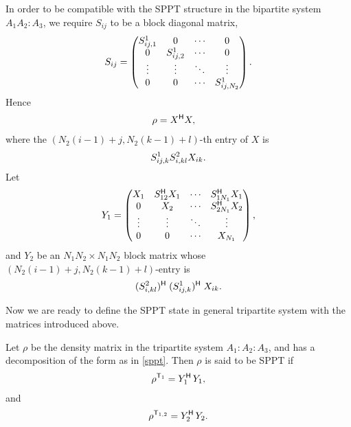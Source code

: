 In order to be compatible with the SPPT structure in the bipartite system $A_1A_2:A_3$, we require  $S_{ij}$ to be a block
diagonal matrix,
\begin{equation}
  \label{eq:7}
    S_{ij}  =
    \begin{pmatrix}
      S^1_{ij,1}& 0 & \cdots &0\\
      0 & S^1_{ij,2}&\cdots & 0\\
      \vdots & \vdots & \ddots & \vdots \\
      0& 0& \cdots & S^1_{ij,N_2}\\
          \end{pmatrix}.
        \end{equation}
 Hence
 \begin{equation}
   \begin{split}
     \rho &= X^{\mathsf{H}} X,
    \end{split}
   \label{sppt}
 \end{equation}
 where the $(N_2(i-1)+j,N_2(k-1)+l)$-th entry of $X$ is $$S^1_{ij,k} S^2_{i,kl} X_{ik}.$$
 Let \begin{align}
 	Y_1	=  \begin{pmatrix}
 	X_1 & S^{\mathsf{H}}_{12}X_1&\cdots &S^{\mathsf{H}}_{1N_1}X_1\\
 	0 & X_2&\cdots  & S^{\mathsf{H}}_{2N_1}X_2\\
 	\vdots &\vdots &\ddots &\vdots\\
 	0 & 0  &\cdots& X_{N_1}\\
 	\end{pmatrix},
 \end{align}
 and $Y_2$ be an $N_1N_2\times N_1N_2$ block matrix whose $(N_2(i-1)+j,N_2(k-1)+l)$-entry is
 \begin{align}
 (S^2_{i,kl})^{\mathsf{H}} \;(S^1_{ij,k} ) ^{\mathsf{H}} \;X_{ik}.
 \end{align}
 
Now we are ready to define the SPPT state in general tripartite system with the matrices introduced above.
\begin{defi}
  Let $\rho$ be the density matrix in the tripartite system  $A_1:A_2:A_3$, and has a    decomposition 
  of the form as in \cref{sppt}. Then  $\rho$ is said to be  SPPT if 
  \begin{align}
  	\rho^{\mathsf{T}_1} = Y_1^{\mathsf{H}}\,Y_1,
  \end{align}
  and \begin{align}
  	\rho^{\mathsf{T}_{1,2}} = Y_2^{\mathsf{H}}\,Y_2.
  \end{align}
\end{defi}

